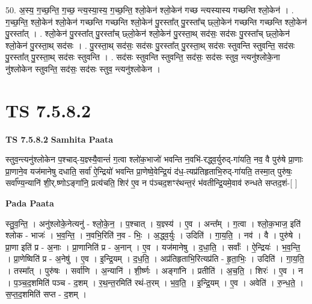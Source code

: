 \documentclass[17pt]{extarticle}
\begin{document}
50. अ॒स्य॒ ग॒च्छ॒न्ति॒ ग॒च्छ॒ न्त्य॒स्या॒स्य॒ ग॒च्छ॒न्ति॒ श्लो॒केन॑ श्लो॒केन॑ गच्छ न्त्यस्यास्य गच्छन्ति श्लो॒केन॑ । . ग॒च्छ॒न्ति॒ श्लो॒केन॑ श्लो॒केन॑ गच्छन्ति गच्छन्ति श्लो॒केन॑ पु॒रस्ता᳚त् पु॒रस्ता᳚च् छ्लो॒केन॑ गच्छन्ति गच्छन्ति श्लो॒केन॑ पु॒रस्ता᳚त् । . श्लो॒केन॑ पु॒रस्ता᳚त् पु॒रस्ता᳚च् छ्लो॒केन॑ श्लो॒केन॑ पु॒रस्ता॒थ् सद॑सः॒ सद॑सः पु॒रस्ता᳚च् छ्लो॒केन॑ श्लो॒केन॑ पु॒रस्ता॒थ् सद॑सः । . पु॒रस्ता॒थ् सद॑सः॒ सद॑सः पु॒रस्ता᳚त् पु॒रस्ता॒थ् सद॑सः स्तुवन्ति स्तुवन्ति॒ सद॑सः पु॒रस्ता᳚त् पु॒रस्ता॒थ् सद॑सः स्तुवन्ति । . सद॑सः स्तुवन्ति स्तुवन्ति॒ सद॑सः॒ सद॑सः स्तुव॒ न्त्यनु॑श्लोके॒ना नु॑श्लोकेन स्तुवन्ति॒ सद॑सः॒ सद॑सः स्तुव॒ न्त्यनु॑श्लोकेन । \newline
\pagebreak
{}

\section{ TS 7.5.8.2 }

\textbf{TS 7.5.8.2 } \newline
\textbf{Samhita Paata} \newline

स्तुव॒न्त्यनु॑श्लोकेन प॒श्चाद्-य॒ज्ञ्स्यै॒वान्तं॑ ग॒त्वा श्लो॑क॒भाजो॑ भवन्ति न॒वभि॑-रद्ध्व॒र्युरुद्-गा॑यति॒ नव॒ वै पुरु॑षे प्रा॒णाः प्रा॒णाने॒व यज॑मानेषु दधाति॒ सर्वा॑ ऐ॒न्द्रियो॑ भवन्ति प्रा॒णेष्वे॒वेन्द्रि॒यं द॑ध॒-त्यप्र॑तिहृताभि॒रुद्-गा॑यति॒ तस्मा॒त् पुरु॑षः॒ सर्वा᳚ण्य॒न्यानि॑ शी॒र्.ष्णोऽङ्गा॑नि॒ प्रत्य॑चति॒ शिर॑ ए॒व न प॑ञ्चद॒शꣳर॑थन्त॒रं भ॑वतीन्द्रि॒यमे॒वाव॑ रुन्धते सप्तद॒शं-[  ] \newline

\textbf{Pada Paata} \newline

स्तु॒व॒न्ति॒ । अनु॑श्लोके॒नेत्यनु॑ - श्लो॒के॒न॒ । प॒श्चात् । य॒ज्ञ्स्य॑ । ए॒व । अन्त᳚म् । ग॒त्वा । श्लो॒क॒भाज॒ इति॑ श्लोक - भाजः॑ । भ॒व॒न्ति॒ । न॒वभि॒रिति॑ न॒व - भिः॒ । अ॒द्ध्व॒र्युः । उदिति॑ । गा॒य॒ति॒ । नव॑ । वै । पुरु॑षे । प्रा॒णा इति॑ प्र - अ॒नाः । प्रा॒णानिति॑ प्र - अ॒नान् । ए॒व । यज॑मानेषु । द॒धा॒ति॒ । सर्वाः᳚ । ऐ॒न्द्रियः॑ । भ॒व॒न्ति॒ । प्रा॒णेष्विति॑ प्र - अ॒नेषु॑ । ए॒व । इ॒न्द्रि॒यम् । द॒ध॒ति॒ । अप्र॑तिहृताभि॒रित्यप्र॑ति - हृ॒ता॒भिः॒ । उदिति॑ । गा॒य॒ति॒ । तस्मा᳚त् । पुरु॑षः । सर्वा॑णि । अ॒न्यानि॑ । शी॒र्ष्णः । अङ्गा॑नि । प्रतीति॑ । अ॒च॒ति॒ । शिरः॑ । ए॒व । न । प॒ञ्च॒द॒शमिति॑ पञ्च - द॒शम् । र॒थ॒न्त॒रमिति॑ रथं-त॒रम् । भ॒व॒ति॒ । इ॒न्द्रि॒यम् । ए॒व । अवेति॑ । रु॒न्ध॒ते॒ । स॒प्त॒द॒शमिति॑ सप्त - द॒शम् ।  \newline
\end{document}
